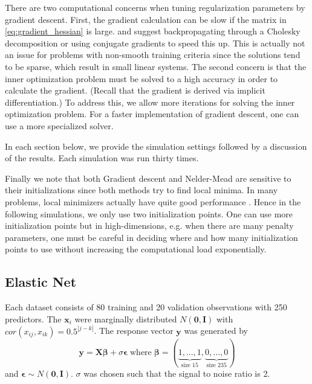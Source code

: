 \documentclass[12pt]{article}
\begin{document}
There are two computational concerns when tuning regularization parameters by gradient descent. First, the gradient calculation can be slow if the matrix in \eqref{eq:gradient_hessian} is large. \citet{bengio2000gradient} and \citet{foo2008efficient} suggest backpropagating through a Cholesky decomposition or using conjugate gradients to speed this up. This is actually not an issue for problems with non-smooth training criteria since the solutions tend to be sparse, which result in small linear systems. The second concern is that the inner optimization problem must be solved to a high accuracy in order to calculate the gradient. (Recall that the gradient is derived via implicit differentiation.) To address this, we allow more iterations for solving the inner optimization problem. For a faster implementation of gradient descent, one can use a more specialized solver.

In each section below, we provide the simulation settings followed by a discussion of the results. Each simulation was run thirty times.

Finally we note that both Gradient descent and Nelder-Mead are sensitive to their initializations since both methods try to find local minima. In many problems, local minimizers actually have quite good performance \citep{kunapuli2008bilevel}. Hence in the following simulations, we only use two initialization points. One can use more initialization points but in high-dimensions, e.g. when there are many penalty parameters, one must be careful in deciding where and how many initialization points to use without increasing the computational load exponentially.

\subsection{Elastic Net}
Each dataset consists of 80 training and 20 validation observations with 250 predictors. The $\boldsymbol x_i$ were marginally distributed $N(\boldsymbol 0,\boldsymbol I)$ with $cor(x_{ij},x_{ik}) = 0.5^{|j-k|}$.
The response vector $\boldsymbol y$ was generated by
\begin{equation}
\boldsymbol y = \boldsymbol X \boldsymbol \beta + \sigma \boldsymbol \epsilon \; \text{where} \; \boldsymbol \beta = (\underbrace{1, ..., 1}_\text{size 15}, \underbrace{0, ..., 0}_\text{size 235})
\end{equation}
and $\boldsymbol \epsilon \sim N(\boldsymbol 0, \boldsymbol I)$. $\sigma$ was chosen such that the signal to noise ratio is 2. 
\end{document}
